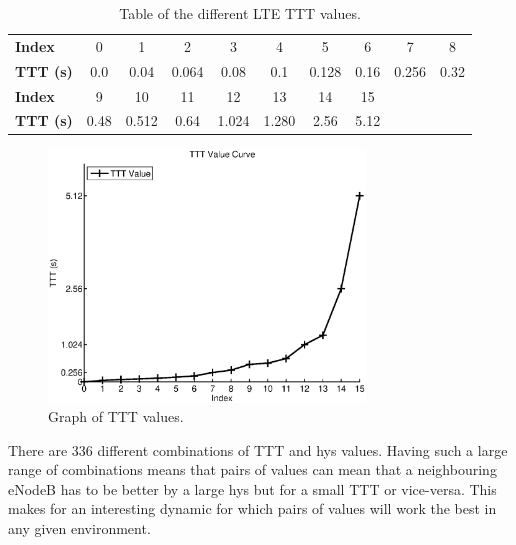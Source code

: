 \begin{table}[H]
  \begin{center}
    \begin{tabular}{| l || c | c | c | c | c | c | c | c | c |}
  	  \hline
      \textbf{Index} & 0 & 1 & 2 & 3 & 4 & 5 & 6 & 7 & 8 \\ 
      \textbf{TTT (s)} & 0.0 & 0.04 & 0.064 & 0.08 & 0.1 & 0.128 & 0.16 & 0.256 & 0.32 \\ 
      \hline
      \cline{1-8}
      \textbf{Index} & 9 & 10 & 11 & 12 & 13 & 14 & 15 & \multicolumn{2}{|c}{} \\
	  \textbf{TTT (s)} & 0.48 & 0.512 & 0.64 & 1.024 & 1.280 & 2.56 & 5.12 & \multicolumn{2}{|c}{} \\
      \cline{1-8}
  	\end{tabular}
  \end{center}
  \caption{Table of the different LTE TTT values.}
  \label{tab:ttt}
\end{table}

\begin{figure}[H]
  \begin{center}
    	  \includegraphics[width=0.75\textwidth]{figures/lte/TTTgraph.eps}
    \end{center}
    \caption{Graph of TTT values.}
    \label{fig:ttt}
\end{figure}

There are 336 different combinations of TTT and hys values. Having such a large range of combinations means that pairs of values can mean that a neighbouring eNodeB has to be better by a large hys but for a small TTT or vice-versa. This makes for an interesting dynamic for which pairs of values will work the best in any given environment.

